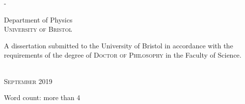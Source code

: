 \begin{titlingpage}
\begin{SingleSpace}
\begin{adjustwidth*}{\unitlength}{-\unitlength}
\begin{center}
\vspace{30mm}
{\large Department of Physics\\
\textsc{University of Bristol}}\\
\vspace{15mm}
\begin{minipage}{8.5cm}
A dissertation submitted to the University of Bristol in accordance with the requirements of the degree of \textsc{Doctor of Philosophy} in the Faculty of Science.
\end{minipage}\\
\vspace{9mm}
{\large\textsc{September 2019}}
\vspace{12mm}
\end{center}
\begin{flushright}
{\small Word count: more than 4}
\end{flushright}
\end{adjustwidth*}
\end{SingleSpace}
\end{titlingpage}